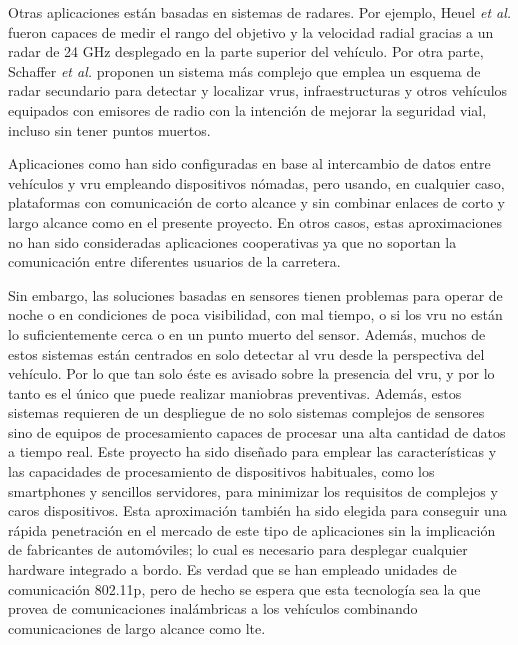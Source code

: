 Otras aplicaciones están basadas en sistemas de radares. Por ejemplo, Heuel
\emph{et al.} \cite{8} fueron capaces de medir el rango del objetivo y la
velocidad radial gracias a un radar de 24 GHz desplegado en la parte superior
del vehículo. Por otra parte, Schaffer \emph{et al.} \cite{9} proponen un
sistema más complejo que emplea un esquema de radar secundario para detectar y
localizar \gls{vru}s, infraestructuras y otros vehículos equipados con emisores
de radio con la intención de mejorar la seguridad vial, incluso sin tener
puntos muertos.

Aplicaciones como \cite{10-12} han sido configuradas en base al intercambio de
datos entre vehículos y \gls{vru} empleando dispositivos nómadas, pero usando,
en cualquier caso, plataformas con comunicación de corto alcance y sin combinar
enlaces de corto y largo alcance como en el presente proyecto. En otros casos,
estas aproximaciones no han sido consideradas aplicaciones cooperativas ya que
no soportan la comunicación entre diferentes usuarios de la carretera.

Sin embargo, las soluciones basadas en sensores tienen problemas para operar
de noche o en condiciones de poca visibilidad, con mal tiempo, o si los
\gls{vru} no están lo suficientemente cerca o en un punto muerto del sensor.
Además, muchos de estos sistemas están centrados en solo detectar al \gls{vru}
desde la perspectiva del vehículo. Por lo que tan solo éste es avisado sobre
la presencia del \gls{vru}, y por lo tanto es el único que puede realizar
maniobras preventivas. Además, estos sistemas requieren de un despliegue de no
solo sistemas complejos de sensores sino de equipos de procesamiento capaces
de procesar una alta cantidad de datos a tiempo real. Este proyecto ha sido
diseñado para emplear las características y las capacidades de procesamiento
de dispositivos habituales, como los smartphones y sencillos servidores, para
minimizar los requisitos de complejos y caros dispositivos. Esta aproximación
también ha sido elegida para conseguir una rápida penetración en el mercado de
este tipo de aplicaciones sin la implicación de fabricantes de automóviles; lo
cual es necesario para desplegar cualquier hardware integrado a bordo. Es
verdad que se han empleado unidades de comunicación \Gls{802.11p}, pero de
hecho se espera que esta tecnología sea la que provea de comunicaciones
inalámbricas a los vehículos combinando comunicaciones de largo alcance como
\gls{lte}\cite{13}.
